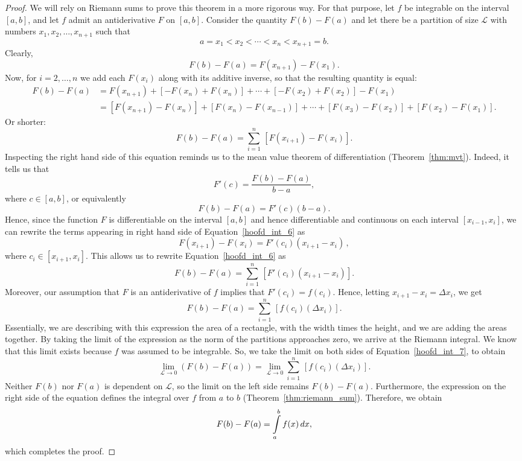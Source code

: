 \ifanalysis

\begin{proof}
We will rely on Riemann sums to prove this theorem in a more rigorous way. For that purpose, let $f$ be integrable on the interval $[a, b]$, and let $f$ admit an antiderivative $F$ on $[a, b]$. Consider the quantity $F(b) - F(a)$ and let there be a partition of size $\mathcal{L}$ with numbers $x_1, x_2, \ldots, x_{n+1}$ such that
$$
\displaystyle a=x_{1}<x_{2}<\cdots <x_{n}<x_{n+1}=b.
$$
Clearly, 
$$
\displaystyle F(b)-F(a)=F(x_{n+1})-F(x_{1}).
$$
Now, for $i=2,\ldots, n$ we add each $F(x_i)$ along with its additive inverse, so that the resulting quantity is equal:
$$
\displaystyle {\begin{aligned}F(b)-F(a)&=F(x_{n+1})+[-F(x_{n})+F(x_{n})]+\cdots +[-F(x_{2})+F(x_{2})]-F(x_{1})\\&=[F(x_{n+1})-F(x_{n})]+[F(x_{n})-F(x_{n-1})]+\cdots +[F(x_{3})-F(x_{2})]+[F(x_{2})-F(x_{1})].\end{aligned}}
$$
Or shorter: 
\begin{equation}
\displaystyle F(b)-F(a)=\sum _{i=1}^{n}\,[F(x_{i+1})-F(x_{i})].
\label{hoofd_int_6}
\end{equation}
Inspecting the right hand side of this equation reminds us to the mean value theorem of differentiation (Theorem~\ref{thm:mvt}). Indeed, it tells us that 
$$
\displaystyle F'(c)={\frac {F(b)-F(a)}{b-a}},
$$
where $c\in[a,b]$, or equivalently
$$
\displaystyle F(b)-F(a)=F'(c)(b-a).
$$
Hence, since the function $F$ is differentiable on the interval $[a, b]$ and hence differentiable and continuous on each interval $[x_{i-1}, x_i]$, we can rewrite the terms appearing in right hand side of Equation~\eqref{hoofd_int_6} as
$$
\displaystyle F(x_{i+1})-F(x_{i})=F'(c_{i})(x_{i+1}-x_{i})\,,
$$
where $c_i\in[x_{i+1},x_i]$. 
This allows us to rewrite Equation~\eqref{hoofd_int_6} as
$$
\displaystyle F(b)-F(a)=\sum _{i=1}^{n}\,[F'(c_{i})(x_{i+1}-x_{i})].
$$
Moreover, our assumption that $F$ is an antiderivative of $f$ implies  that $F'(c_{i})=f(c_{i})$. Hence, letting $x_{i+1}-x_{i}= \Delta x_i$, we get 
\begin{equation}
\displaystyle F(b)-F(a)=\sum _{i=1}^{n}\,[f(c_{i})(\Delta x_{i})].
\label{hoofd_int_7}
\end{equation}
Essentially, we are describing with this expression the area of a rectangle, with the width times the height, and we are adding the areas together. By taking the limit of the expression as the norm of the partitions approaches zero, we arrive at the Riemann integral. We know that this limit exists because $f$ was assumed to be integrable. So, we take the limit on both sides of Equation~\eqref{hoofd_int_7}, to obtain
$$
\displaystyle \lim _{\mathcal{L}\to 0}\left(F(b)-F(a)\right)=\lim _{\mathcal{L}\to 0}\sum _{i=1}^{n}\,[f(c_{i})(\Delta x_{i})].
$$
Neither $F(b)$ nor $F(a)$ is dependent on $\displaystyle \mathcal{L}$, so the limit on the left side remains $F(b) - F(a)$. Furthermore, the expression on the right side of the equation defines the integral over $f$ from $a$ to $b$ (Theorem~\ref{thm:riemann_sum}). Therefore, we obtain
$$
\displaystyle F(b)-F(a)=\displaystyle \int\limits _{a}^{b}f(x)\,dx,
$$
which completes the proof.
\end{proof}

